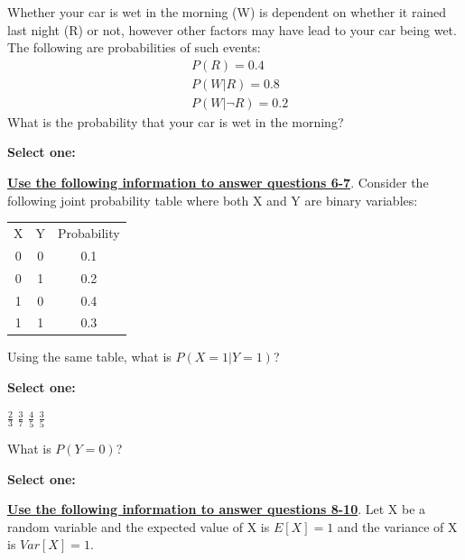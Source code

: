 \documentclass[11pt,addpoints,answers]{exam}
\numberwithin{equation}{section} %
\numberwithin{figure}{section} %
\numberwithin{table}{section} %
\begin{document}
\begin{questions}
\clearpage
    \question[2] Whether your car is wet in the morning (W) is dependent on whether it rained last night (R) or not, however other factors may have lead to your car being wet. The following are probabilities of such events:
    \begin{eqnarray*}
        & P(R) = 0.4\\
        & P(W | R) = 0.8\\
        & P(W | \neg R ) = 0.2
    \end{eqnarray*} What is the probability that your car is wet in the morning?

    \textbf{Select one:}
    \begin{checkboxes}
    \end{checkboxes}

    \bigskip
    \textbf{\underline{Use the following information to answer questions 6-7}}. Consider the following joint probability table where both X and Y are binary variables:\\[12pt] 
    \begin{tabular}{ccc}
    X & Y & Probability \\
    0 & 0 & 0.1\\
    0 & 1 & 0.2\\
    1 & 0 & 0.4\\
    1 & 1 & 0.3
    \end{tabular}


    \question[1] Using the same table, what is $P(X = 1 | Y=1)$?

    \textbf{Select one:}
    \begin{checkboxes}
        \choice $\frac{2}{3}$
        \choice $\frac{3}{7}$
        \choice $\frac{4}{5}$
        \choice $\frac{3}{5}$
    \end{checkboxes}


    \question[1] What is $P(Y=0)$?

    \textbf{Select one:}
    \begin{checkboxes}
    \end{checkboxes}

    
    
    \clearpage
    \textbf{\underline{Use the following information to answer questions 8-10}}. Let X be a random variable and the expected value of X is $E[X] = 1$ and the variance of X is $Var[X] = 1$. 


\end{questions}
\end{document}
